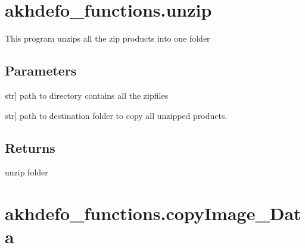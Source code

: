 \documentclass[letterpaper,10pt]{sphinxmanual}
\begin{document}
\sphinxstepscope


\chapter{akhdefo\_functions.unzip}
\label{\detokenize{generated/akhdefo_functions.unzip:akhdefo-functions-unzip}}\label{\detokenize{generated/akhdefo_functions.unzip::doc}}\label{\detokenize{generated/akhdefo_functions.unzip::doc}}

\begin{fulllineitems}
\label{\detokenize{generated/akhdefo_functions.unzip:akhdefo_functions.unzip}}
\pysigstartsignatures
{}
\pysigstopsignatures
\sphinxAtStartPar
This program unzips all the zip products into one folder


\section{Parameters}
\label{\detokenize{generated/akhdefo_functions.unzip:parameters}}\begin{description}
\sphinxlineitem{zipdir}{[}str{]}
\sphinxAtStartPar
path to directory contains all the zipfiles

\sphinxlineitem{dst\_dir}{[}str{]}
\sphinxAtStartPar
path to destination folder to copy all unzipped products.

\end{description}


\section{Returns}
\label{\detokenize{generated/akhdefo_functions.unzip:returns}}
\sphinxAtStartPar
unzip folder

\end{fulllineitems}


\sphinxstepscope


\chapter{akhdefo\_functions.copyImage\_Data}
\label{\detokenize{generated/akhdefo_functions.copyImage_Data:akhdefo-functions-copyimage-data}}\label{\detokenize{generated/akhdefo_functions.copyImage_Data::doc}}
\end{document}
